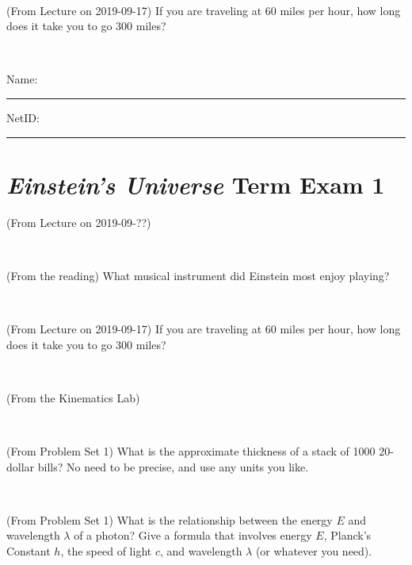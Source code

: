 \documentclass[12pt, letterpaper]{article}
\begin{document}
\vfill ~

\begin{problem} (From Lecture on 2019-09-17)
If you are traveling at 60 miles per hour, how long does
it take you to go 300 miles?
\end{problem}


\vfill ~


\cleardoublepage



\noindent
Name: \rule[-1ex]{0.60\textwidth}{0.1pt}
NetID: \rule[-1ex]{0.20\textwidth}{0.1pt}

\section*{\textsl{Einstein's Universe} Term Exam 1}
\setcounter{problem}{1}


\begin{problem} (From Lecture on 2019-09-??)
\end{problem}


\vfill ~

\begin{problem} (From the reading)
What musical instrument did Einstein most enjoy playing?
\end{problem}


\vfill ~

\begin{problem} (From Lecture on 2019-09-17)
If you are traveling at 60 miles per hour, how long does
it take you to go 300 miles?
\end{problem}


\vfill ~

\begin{problem} (From the Kinematics Lab)

\end{problem}


\vfill ~


\clearpage


\begin{problem} (From Problem Set 1)
What is the approximate thickness of a stack of 1000 20-dollar bills?
No need to be precise, and use any units you like.
\end{problem}


\vfill ~

\begin{problem} (From Problem Set 1)
What is the relationship between the energy $E$ and wavelength
$\lambda$ of a photon? Give a formula that involves energy $E$,
Planck's Constant $h$, the speed of light $c$, and wavelength
$\lambda$ (or whatever you need).
\end{problem}
\end{document}
